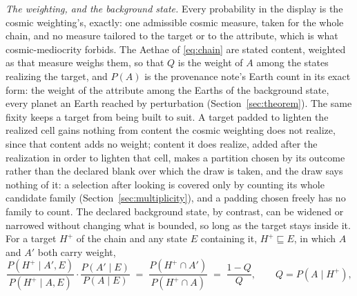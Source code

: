 \textit{The weighting, and the background state.} Every probability in the display is the cosmic weighting's, exactly: one admissible cosmic measure, taken for the whole chain, and no measure tailored to the target or to the attribute, which is what cosmic-mediocrity forbids. The Aethae of \eqref{eq:chain} are stated content, weighted as that measure weighs them, so that $Q$ is the weight of $A$ among the states realizing the target, and $P(A)$ is the provenance note's Earth count in its exact form: the weight of the attribute among the Earths of the background state, every planet an Earth reached by perturbation (Section~\ref{sec:theorem}). The same fixity keeps a target from being built to suit. A target padded to lighten the realized cell gains nothing from content the cosmic weighting does not realize, since that content adds no weight; content it does realize, added after the realization in order to lighten that cell, makes a partition chosen by its outcome rather than the declared blank over which the draw is taken, and the draw says nothing of it: a selection after looking is covered only by counting its whole candidate family (Section~\ref{sec:multiplicity}), and a padding chosen freely has no family to count. The declared background state, by contrast, can be widened or narrowed without changing what is bounded, so long as the target stays inside it. For a target $H^{+}$ of the chain and any state $E$ containing it, $H^{+} \sqsubseteq E$, in which $A$ and $A'$ both carry weight,
\begin{equation}
\label{eq:background-invariance}
\frac{P(H^{+} \mid A', E)}{P(H^{+} \mid A, E)} \cdot \frac{P(A' \mid E)}{P(A \mid E)} \;=\; \frac{P(H^{+} \cap A')}{P(H^{+} \cap A)} \;=\; \frac{1-Q}{Q}, \qquad Q = P(A \mid H^{+}),
\end{equation}
